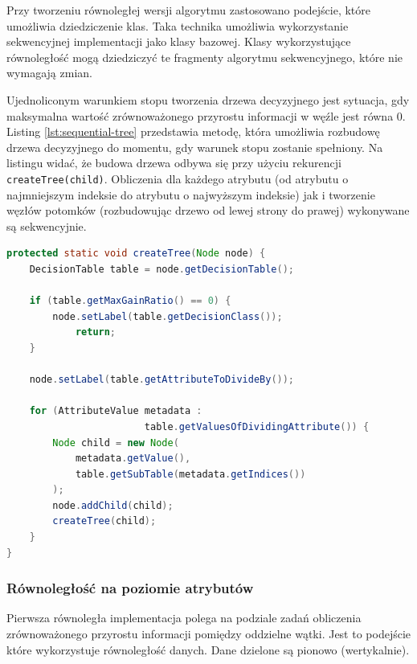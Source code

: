 \documentclass[12pt]{article}
\begin{document}
Przy tworzeniu równoległej wersji algorytmu zastosowano podejście, które umożliwia dziedziczenie klas. Taka technika umożliwia wykorzystanie
sekwencyjnej implementacji jako klasy bazowej. Klasy wykorzystujące równoległość mogą dziedziczyć te fragmenty algorytmu sekwencyjnego,
które nie wymagają zmian.

Ujednoliconym warunkiem stopu tworzenia drzewa decyzyjnego jest sytuacja, gdy maksymalna wartość zrównoważonego
przyrostu informacji w węźle jest równa 0. Listing \ref{lst:sequential-tree} przedstawia metodę, która
umożliwia rozbudowę drzewa decyzyjnego do momentu, gdy warunek stopu zostanie spełniony. Na listingu widać, że budowa
drzewa odbywa się przy użyciu rekurencji \verb|createTree(child)|.
Obliczenia dla każdego atrybutu (od atrybutu o najmniejszym indeksie do atrybutu o najwyższym indeksie) jak i tworzenie węzłów potomków
(rozbudowując drzewo od lewej strony do prawej) wykonywane są sekwencyjnie. 

\begin{lstlisting}[language=java, caption=Rekurencyjne tworzenie drzewa decyzyjnego,frame=single,label={lst:sequential-tree}]
protected static void createTree(Node node) {
    DecisionTable table = node.getDecisionTable();

    if (table.getMaxGainRatio() == 0) {
        node.setLabel(table.getDecisionClass());
            return;
    }

    node.setLabel(table.getAttributeToDivideBy());

    for (AttributeValue metadata :
                        table.getValuesOfDividingAttribute()) {
        Node child = new Node(
            metadata.getValue(),
            table.getSubTable(metadata.getIndices())
        );
        node.addChild(child);
        createTree(child);
    }
}
\end{lstlisting}

\subsubsection{Równoległość na poziomie atrybutów}

Pierwsza równoległa implementacja polega na podziale zadań obliczenia zrównoważonego przyrostu informacji pomiędzy oddzielne wątki.
Jest to podejście które wykorzystuje równoległość danych. Dane dzielone są pionowo (wertykalnie).
\end{document}
